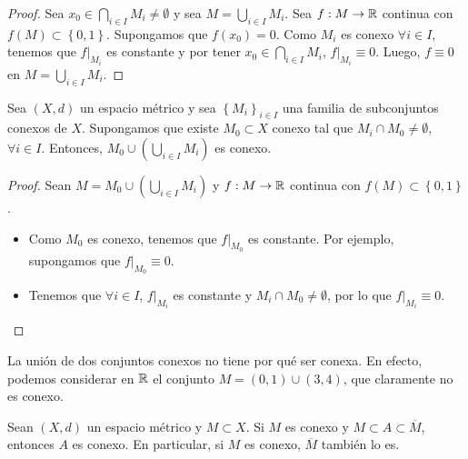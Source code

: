 \begin{proof}
	Sea $\displaystyle x_{0} \in \bigcap_{i \in I}M_{i} \neq \emptyset $ y sea $\displaystyle M = \bigcup_{i \in I}M_{i}$. Sea $\displaystyle f : M \to \mathbb{R} $ continua con $\displaystyle f\left(M\right) \subset \left\{ 0,1\right\}  $. Supongamos que $\displaystyle f\left(x_{0}\right) = 0 $. Como $\displaystyle M_{i} $ es conexo $\displaystyle \forall i  \in I $, tenemos que $\displaystyle f|_{M_{i}} $ es constante y por tener $\displaystyle x_{0} \in \bigcap_{i \in I}M_{i} $, $\displaystyle f|_{M_{i}} \equiv 0 $.
	Luego, $\displaystyle f \equiv 0 $ en $\displaystyle M = \bigcup_{i \in I}M_{i} $.
\end{proof}
\begin{lema}
	Sea $\displaystyle \left(X,d\right) $ un espacio métrico y sea $\displaystyle \left\{ M_{i}\right\} _{i\in I} $ una familia de subconjuntos conexos de $\displaystyle X $. Supongamos que existe $\displaystyle M_{0} \subset X $ conexo tal que $\displaystyle M_{i} \cap M_{0} \neq \emptyset $, $\displaystyle \forall i \in I $. Entonces, $\displaystyle M_{0} \cup \left(\bigcup_{i \in I}M_{i}\right) $ es conexo.
\end{lema}
\begin{proof}
	Sean $\displaystyle M = M_{0} \cup \left(\bigcup_{ i \in I}M_{i}\right) $ y $\displaystyle f : M \to \mathbb{R} $ continua con $\displaystyle f\left(M\right) \subset \left\{ 0,1\right\}  $. 
	\begin{itemize}
	\item Como $\displaystyle M_{0} $ es conexo, tenemos que $\displaystyle f|_{M_{0}} $ es constante. Por ejemplo, supongamos que $\displaystyle f|_{M_{0}} \equiv 0 $. 
	\item Tenemos que $\displaystyle \forall i \in I $, $\displaystyle f|_{M_{i}} $ es constante y $\displaystyle M_{i} \cap M_{0} \neq \emptyset $, por lo que $\displaystyle f|_{M_{i}} \equiv 0 $.
	\end{itemize}
\end{proof}
\begin{observation}
La unión de dos conjuntos conexos no tiene por qué ser conexa. En efecto, podemos considerar en $\displaystyle \mathbb{R} $ el conjunto $\displaystyle M = \left(0,1\right) \cup \left(3,4\right) $, que claramente no es conexo.
\end{observation}
\begin{theorem}
Sean $\displaystyle \left(X,d\right) $ un espacio métrico y $\displaystyle M \subset X $. Si $\displaystyle M $ es conexo y $\displaystyle M \subset A \subset \overline{M} $, entonces $\displaystyle A $ es conexo. En particular, si $\displaystyle M $ es conexo, $\displaystyle \overline{M} $ también lo es.
\end{theorem}
